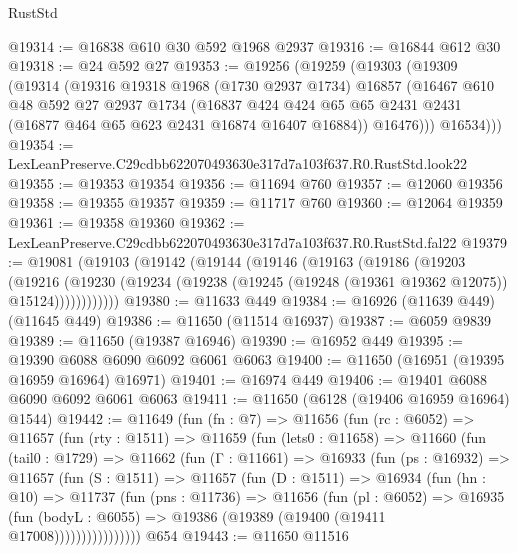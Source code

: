 \begin{lexlean}{RustStd}
\begin{coremodule}
@19314 := @16838 @610 @30 @592 @1968 @2937
@19316 := @16844 @612 @30
@19318 := @24 @592 @27
@19353 := @19256
    (@19259
      (@19303
        (@19309
          (@19314
            (@19316
              @19318
              @1968
              (@1730 @2937 @1734)
              @16857
              (@16467
                @610
                @48
                @592
                @27
                @2937
                @1734
                (@16837
                  @424
                  @424
                  @65
                  @65
                  @2431
                  @2431
                  (@16877 @464 @65 @623 @2431 @16874 @16407 @16884))
                @16476)))
          @16534)))
@19354 := LexLeanPreserve.C29cdbb622070493630e317d7a103f637.R0.RustStd.look22
@19355 := @19353 @19354
@19356 := @11694 @760
@19357 := @12060 @19356
@19358 := @19355 @19357
@19359 := @11717 @760
@19360 := @12064 @19359
@19361 := @19358 @19360
@19362 := LexLeanPreserve.C29cdbb622070493630e317d7a103f637.R0.RustStd.fal22
@19379 := @19081
    (@19103
      (@19142
        (@19144
          (@19146
            (@19163
              (@19186
                (@19203
                  (@19216
                    (@19230
                      (@19234 (@19238 (@19245 (@19248 (@19361 @19362 @12075)) @15124))))))))))))
@19380 := @11633 @449
@19384 := @16926 (@11639 @449) (@11645 @449)
@19386 := @11650 (@11514 @16937)
@19387 := @6059 @9839
@19389 := @11650 (@19387 @16946)
@19390 := @16952 @449
@19395 := @19390 @6088 @6090 @6092 @6061 @6063
@19400 := @11650 (@16951 (@19395 @16959 @16964) @16971)
@19401 := @16974 @449
@19406 := @19401 @6088 @6090 @6092 @6061 @6063
@19411 := @11650 (@6128 (@19406 @16959 @16964) @1544)
@19442 := @11649
    (fun (fn : @7) =>
    @11656
      (fun (rc : @6052) =>
      @11657
        (fun (rty : @1511) =>
        @11659
          (fun (lets0 : @11658) =>
          @11660
            (fun (tail0 : @1729) =>
            @11662
              (fun (Γ : @11661) =>
              @16933
                (fun (ps : @16932) =>
                @11657
                  (fun (S : @1511) =>
                  @11657
                    (fun (D : @1511) =>
                    @16934
                      (fun (hn : @10) =>
                      @11737
                        (fun (pns : @11736) =>
                        @11656
                          (fun (pl : @6052) =>
                          @16935
                            (fun (bodyL : @6055) =>
                            @19386 (@19389 (@19400 (@19411 @17008))))))))))))))))
    @654
@19443 := @11650 @11516

\end{coremodule}
\end{lexlean}
